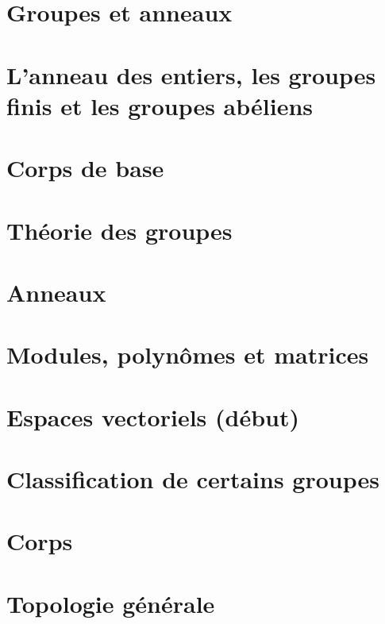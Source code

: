 \documentclass[a4paper,twoside,11pt]{book}
\begin{document}
\chapter{Groupes et anneaux}



\chapter{L'anneau des entiers, les groupes finis et les groupes abéliens}



\chapter{Corps de base}




\chapter{Théorie des groupes}


\chapter{Anneaux}


\chapter{Modules, polynômes et matrices} \label{ChapMatricesPolyn}



\chapter{Espaces vectoriels (début)}



\chapter{Classification de certains groupes}


\chapter{Corps}




\chapter{Topologie générale} \label{ChapTopologieGenerale}

\end{document}
